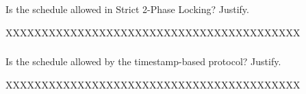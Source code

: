 \subsubsection{}
{\color{gray}Is the schedule allowed in Strict 2-Phase Locking? Justify.}

{\color{red}XXXXXXXXXXXXXXXXXXXXXXXXXXXXXXXXXXXXXXXXX}
\subsubsection{}
{\color{gray}Is the schedule allowed by the timestamp-based protocol? Justify.}

{\color{red}XXXXXXXXXXXXXXXXXXXXXXXXXXXXXXXXXXXXXXXXX}
